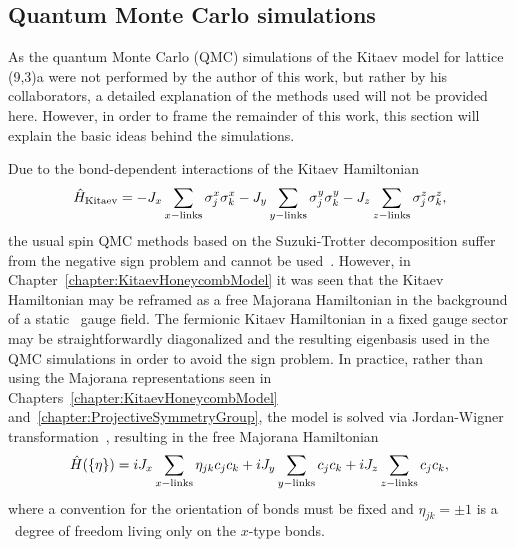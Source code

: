 \subsection{Quantum Monte Carlo simulations}
\label{section:chapter06_QMC}
%
%
As the quantum Monte Carlo (QMC) simulations of the Kitaev model for lattice (9,3)a were not performed by the author of this work, but rather by his collaborators, a detailed explanation of the methods used will not be provided here.
However, in order to frame the remainder of this work, this section will explain the basic ideas behind the simulations.

Due to the bond-dependent interactions of the Kitaev Hamiltonian
%
\begin{equation}
	\hat{H}_{\rm Kitaev} = -J_x \sum_{x {\rm -links}} \sigma_j^x \sigma_k^x - J_y \sum_{y {\rm -links}} \sigma_j^y \sigma_k^y - J_z \sum_{z {\rm -links}} \sigma_j^z \sigma_k^z,
\end{equation}
%
the usual spin QMC methods based on the Suzuki-Trotter decomposition suffer from the negative sign problem and cannot be used~\cite{NasuPRL2014}.
However, in Chapter~\ref{chapter:KitaevHoneycombModel} it was seen that the Kitaev Hamiltonian may be reframed as a free Majorana Hamiltonian in the background of a static \ZZ~gauge field.
The fermionic Kitaev Hamiltonian in a fixed gauge sector may be straightforwardly diagonalized and the resulting eigenbasis used in the QMC simulations in order to avoid the sign problem.
In practice, rather than using the Majorana representations seen in Chapters~\ref{chapter:KitaevHoneycombModel} and~\ref{chapter:ProjectiveSymmetryGroup}, the model is solved via Jordan-Wigner transformation~\cite{ChenPRB2007,FengPRL2007,ChenJPA2008}, resulting in the free Majorana Hamiltonian
%
\begin{equation}
	\hat{H}(\{\eta\}) = i J_x \sum_{x {\rm -links}} \eta_{jk} c_j c_k + i J_y \sum_{y {\rm -links}} c_j c_k + i J_z \sum_{z {\rm -links}} c_j c_k,
	\label{eq:chapter06_JWHamiltonian}
\end{equation}
%
where a convention for the orientation of bonds must be fixed and $\eta_{jk} = \pm 1$ is a \ZZ~degree of freedom living only on the $x$-type bonds.

